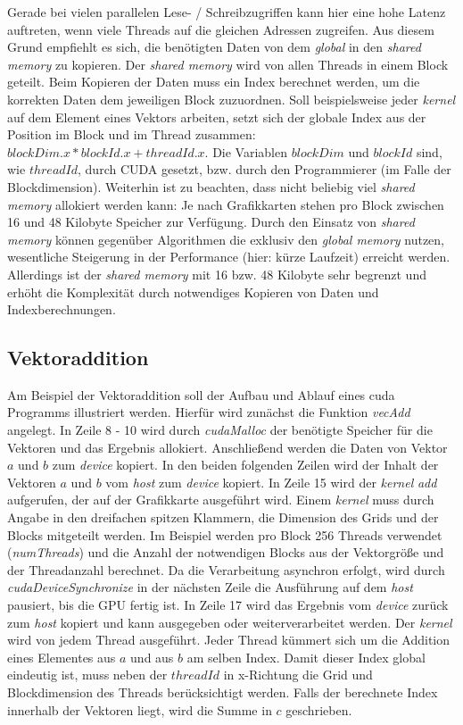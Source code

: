Gerade bei vielen parallelen Lese- / Schreibzugriffen kann hier eine hohe Latenz auftreten, wenn viele Threads auf die gleichen Adressen zugreifen. Aus diesem Grund empfiehlt es sich, die benötigten Daten von dem \textit{global} in den \textit{shared memory} zu kopieren. Der \textit{shared memory} wird von allen Threads in einem Block geteilt. Beim Kopieren der Daten muss ein Index berechnet werden, um die korrekten Daten dem jeweiligen Block zuzuordnen. Soll beispielsweise jeder \textit{kernel} auf dem Element eines Vektors arbeiten, setzt sich der globale Index aus der Position im Block und im Thread zusammen: $blockDim.x * blockId.x + threadId.x$. Die Variablen $blockDim$ und $blockId$ sind, wie $threadId$, durch CUDA gesetzt, bzw. durch den Programmierer (im Falle der Blockdimension). Weiterhin ist zu beachten, dass nicht beliebig viel \textit{shared memory} allokiert werden kann: Je nach Grafikkarten stehen pro Block zwischen 16 und 48 Kilobyte Speicher zur Verfügung. 
Durch den Einsatz von \textit{shared memory} können gegenüber Algorithmen die exklusiv den \textit{global memory} nutzen, wesentliche Steigerung in der Performance (hier: kürze Laufzeit) erreicht werden. Allerdings ist der \textit{shared memory} mit 16 bzw. 48 Kilobyte sehr begrenzt und erhöht die Komplexität durch notwendiges Kopieren von Daten und Indexberechnungen.

\subsection{Vektoraddition}

Am Beispiel der Vektoraddition soll der Aufbau und Ablauf eines cuda Programms illustriert werden. Hierfür wird zunächst die Funktion \textit{vecAdd} angelegt. In Zeile 8 - 10 wird durch \textit{cudaMalloc} der benötigte Speicher für die Vektoren und das Ergebnis allokiert. Anschließend werden die Daten von Vektor $a$ und $b$ zum \textit{device} kopiert. In den beiden folgenden Zeilen wird der Inhalt der Vektoren $a$ und $b$ vom \textit{host} zum \textit{device} kopiert. In Zeile 15 wird der \textit{kernel} \textit{add} aufgerufen, der auf der Grafikkarte ausgeführt wird. Einem \textit{kernel} muss durch Angabe in den dreifachen spitzen Klammern, die Dimension des Grids und der Blocks mitgeteilt werden. Im Beispiel werden pro Block 256 Threads verwendet (\textit{numThreads}) und die Anzahl der notwendigen Blocks aus der Vektorgröße und der Threadanzahl berechnet. Da die Verarbeitung asynchron erfolgt, wird durch \textit{cudaDeviceSynchronize} in der nächsten Zeile die Ausführung auf dem \textit{host} pausiert, bis die GPU fertig ist. In Zeile 17 wird das Ergebnis vom \textit{device} zurück zum \textit{host} kopiert und kann ausgegeben oder weiterverarbeitet werden.
Der \textit{kernel} wird von jedem Thread ausgeführt. Jeder Thread kümmert sich um die Addition eines Elementes aus $a$ und aus $b$ am selben Index. Damit dieser Index global eindeutig ist, muss neben der $threadId$ in x-Richtung die Grid und Blockdimension des Threads berücksichtigt werden. Falls der berechnete Index innerhalb der Vektoren liegt, wird die Summe in $c$ geschrieben.

